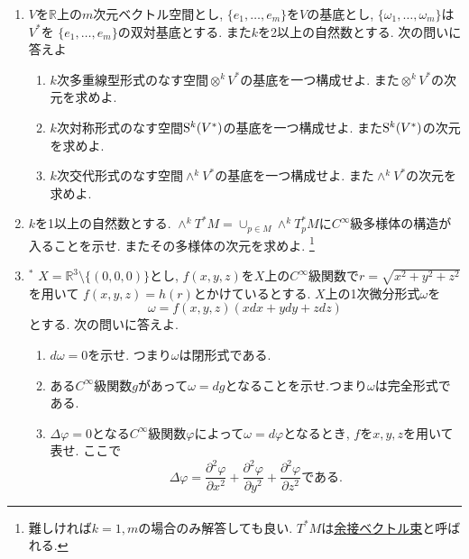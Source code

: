 \documentclass[dvipdfmx,a4paper,11pt]{article}
\newcommand{\R}{\mathbb{R}}
\theoremstyle{definition}
\newcommand{\pdrv}[2]{\frac{\partial #1}{\partial #2}}
\begin{document}
\begin{enumerate}[label=\textbf{問}3.\arabic*]
\item $V$を$\R$上の$m$次元ベクトル空間とし, $\{ e_1, \ldots, e_m\}$を$V$の基底とし, $\{ \omega_1, \ldots, \omega_m\}$は$V^{*}$を $\{ e_1, \ldots, e_m\}$の双対基底とする. また$k$を2以上の自然数とする. 次の問いに答えよ
\begin{enumerate}
 \setlength{\parskip}{0cm}
  \setlength{\itemsep}{2pt} 
\item %
$k$次多重線型形式のなす空間$\otimes^{k} V^{*}$の基底を一つ構成せよ. また$\otimes^{k} V^{*}$の次元を求めよ.
\item $k$次対称形式のなす空間${\rm S}^{k}(V^{*})$の基底を一つ構成せよ. また${\rm S}^{k}(V^{*})$の次元を求めよ.
\item $k$次交代形式のなす空間$\wedge^{k} V^{*}$の基底を一つ構成せよ. また$\wedge^{k} V^{*}$の次元を求めよ.
\end{enumerate}



\item $k$を1以上の自然数とする. $\wedge^{k}T^{*}M = \cup_{p \in M}\wedge^{k}T_{p}^{*}M$に$C^{\infty}$級多様体の構造が入ることを示せ. またその多様体の次元を求めよ. \footnote{難しければ$k=1,m$の場合のみ解答しても良い. $T^{*}M$は\underline{余接ベクトル束}と呼ばれる. }

\item $^{*}$ $X = \R^3 \setminus \{(0,0,0)\}$とし, $f(x,y,z)$を$X$上の$C^{\infty}$級関数で$r = \sqrt{x^2 + y^2 + z^2}$を用いて
$f(x,y,z) = h(r)$とかけているとする.
$X$上の1次微分形式$\omega$を
$$
\omega = f(x,y,z)(x dx + y dy + z dz)
$$
とする. 次の問いに答えよ.
\begin{enumerate}
 \setlength{\parskip}{0cm}
  \setlength{\itemsep}{2pt} 
\item $d\omega =0$を示せ. つまり$\omega$は閉形式である.
\item ある$C^{\infty}$級関数$g$があって$\omega =dg$となることを示せ.つまり$\omega$は完全形式である.
\item $\Delta \varphi=0$となる$C^{\infty}$級関数$\varphi$によって$\omega =d\varphi$となるとき, $f$を$x,y,z$を用いて表せ. 
ここで
$$
\Delta \varphi=\pdrv{^2\varphi}{x^{2}}+\pdrv{^2\varphi}{y^{2}}+\pdrv{^2\varphi}{z^{2}}
\text{である.}
$$
\end{enumerate}


\end{enumerate}
\end{document}
